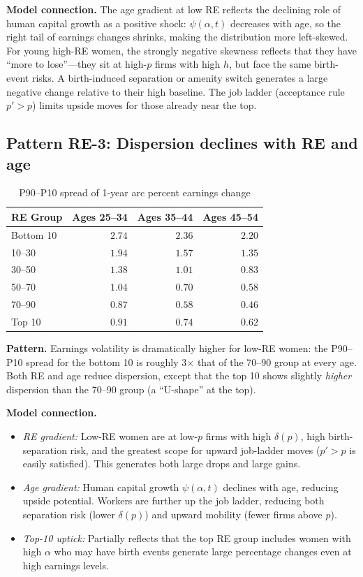 \documentclass[11pt]{article}
\begin{document}
\medskip\noindent\textbf{Model connection.} The age gradient at low RE reflects the declining role of human capital growth as a positive shock: $\psi(\alpha, t)$ decreases with age, so the right tail of earnings changes shrinks, making the distribution more left-skewed. For young high-RE women, the strongly negative skewness reflects that they have ``more to lose''---they sit at high-$p$ firms with high $h$, but face the same birth-event risks. A birth-induced separation or amenity switch generates a large negative change relative to their high baseline. The job ladder (acceptance rule $p' > p$) limits upside moves for those already near the top.

\subsection{Pattern RE-3: Dispersion declines with RE and age}

\begin{table}[h]\centering
\caption{P90--P10 spread of 1-year arc percent earnings change}
\begin{tabular}{lrrr}
\toprule
RE Group & Ages 25--34 & Ages 35--44 & Ages 45--54 \\
\midrule
Bottom 10 & $2.74$ & $2.36$ & $2.20$ \\
10--30    & $1.94$ & $1.57$ & $1.35$ \\
30--50    & $1.38$ & $1.01$ & $0.83$ \\
50--70    & $1.04$ & $0.70$ & $0.58$ \\
70--90    & $0.87$ & $0.58$ & $0.46$ \\
Top 10    & $0.91$ & $0.74$ & $0.62$ \\
\bottomrule
\end{tabular}
\end{table}

\noindent\textbf{Pattern.} Earnings volatility is dramatically higher for low-RE women: the P90--P10 spread for the bottom 10 is roughly 3$\times$ that of the 70--90 group at every age. Both RE and age reduce dispersion, except that the top 10 shows slightly \emph{higher} dispersion than the 70--90 group (a ``U-shape'' at the top).

\medskip\noindent\textbf{Model connection.}
\begin{itemize}[nosep]
  \item \emph{RE gradient:} Low-RE women are at low-$p$ firms with high $\delta(p)$, high birth-separation risk, and the greatest scope for upward job-ladder moves ($p' > p$ is easily satisfied). This generates both large drops and large gains.
  \item \emph{Age gradient:} Human capital growth $\psi(\alpha, t)$ declines with age, reducing upside potential. Workers are further up the job ladder, reducing both separation risk (lower $\delta(p)$) and upward mobility (fewer firms above $p$).
  \item \emph{Top-10 uptick:} Partially reflects that the top RE group includes women with high $\alpha$ who may have birth events generate large percentage changes even at high earnings levels.
\end{itemize}
\end{document}
